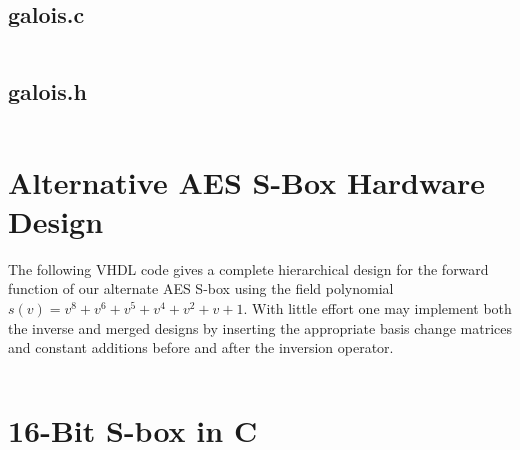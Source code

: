 \subsection{galois.c}
\inputminted[fontsize=\tiny,frame=single]{c}{../../src/GaloisLibrary/galois.c}
\subsection{galois.h}
\inputminted[fontsize=\tiny,frame=single]{c}{../../src/GaloisLibrary/galois.h}

\section{Alternative AES S-Box Hardware Design}
The following VHDL code gives a complete hierarchical design for the forward function of our alternate AES S-box using the field polynomial $s(v) = v^8 + v^6 + v^5 + v^4 + v^2 + v + 1$. With little effort one may implement both the inverse and merged designs by inserting the appropriate basis change matrices and constant additions before and after the inversion operator.
\inputminted[fontsize=\tiny,frame=single]{vhdl}{../../src/Hardware/aes_alternative/forward_sbox/all.vhd}

\section{16-Bit S-box in C}
\inputminted[fontsize=\tiny,frame=single]{c}{../../src/GaloisLibrary/sbox16_unopt.c}
